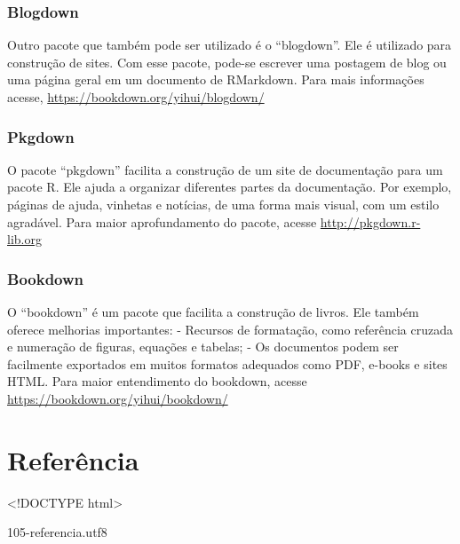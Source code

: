 \documentclass[
]{book}
\begin{document}
\hypertarget{blogdown}{%
\subsection{Blogdown}\label{blogdown}}

Outro pacote que também pode ser utilizado é o ``blogdown''.
Ele é utilizado para construção de sites. Com esse pacote, pode-se escrever uma postagem de blog ou uma página geral em um documento de RMarkdown.
Para mais informações acesse, \url{https://bookdown.org/yihui/blogdown/}

\hypertarget{pkgdown}{%
\subsection{Pkgdown}\label{pkgdown}}

O pacote ``pkgdown'' facilita a construção de um site de documentação para um pacote R. Ele ajuda a organizar diferentes partes da documentação.
Por exemplo, páginas de ajuda, vinhetas e notícias, de uma forma mais visual, com um estilo agradável.
Para maior aprofundamento do pacote, acesse \url{http://pkgdown.r-lib.org}

\hypertarget{bookdown}{%
\subsection{Bookdown}\label{bookdown}}

O ``bookdown'' é um pacote que facilita a construção de livros. Ele também oferece melhorias importantes:
- Recursos de formatação, como referência cruzada e numeração de figuras, equações e tabelas;
- Os documentos podem ser facilmente exportados em muitos formatos adequados como PDF, e-books e sites HTML.
Para maior entendimento do bookdown, acesse \url{https://bookdown.org/yihui/bookdown/}

\hypertarget{referuxeancia}{%
\chapter{Referência}\label{referuxeancia}}

\textless!DOCTYPE html\textgreater{}

105-referencia.utf8

\hypertarget{header}{}
\begin{fluid-row}

\end{fluid-row}
\end{document}

